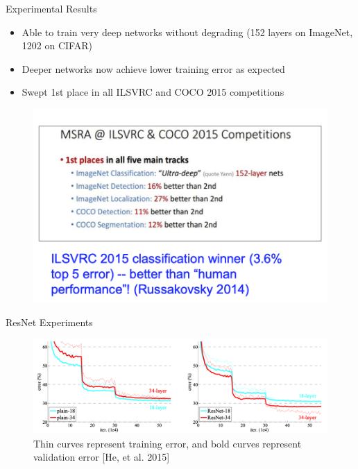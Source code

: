 \documentclass[serif, aspectratio=169]{beamer}
\begin{document}
\begin{frame}{Experimental Results}
	\begin{itemize}
		\item Able to train very deep networks without degrading (152 layers on ImageNet, 1202 on CIFAR)
		\item Deeper networks now achieve lower training error as expected
		\item Swept 1st place in all ILSVRC and COCO 2015 competitions
	\end{itemize}
	
	\begin{figure}[htpb]
		\begin{center}
			\includegraphics[keepaspectratio, scale=0.23]{pic/resnet_result}
		\end{center}
	\end{figure}
\end{frame}

\begin{frame}{ResNet Experiments}
	\begin{figure}[htpb]
		\begin{center}
			\includegraphics[keepaspectratio, scale=0.22]{pic/ResNetExp}
			\caption*{\scriptsize Thin curves represent training error, and bold curves represent validation error [He, et al. 2015]}
		\end{center}
	\end{figure}
\end{frame}
\end{document}
